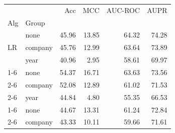 \begin{table}
\centering
\begin{tabular}{llrrrr}
\toprule
 &  & Acc & MCC & AUC-ROC & AUPR \\
Alg & Group &  &  &  &  \\
\midrule
\multirow[c]{3}{*}{LR} & none & {\cellcolor[HTML]{FDC28B}} \color[HTML]{000000} 45.96 & {\cellcolor[HTML]{D34601}} \color[HTML]{F1F1F1} 13.85 & {\cellcolor[HTML]{7F2704}} \color[HTML]{F1F1F1} 64.32 & {\cellcolor[HTML]{7F2704}} \color[HTML]{F1F1F1} 74.28 \\
\cline{2-6}
 & company & {\cellcolor[HTML]{FDC48F}} \color[HTML]{000000} 45.76 & {\cellcolor[HTML]{DE5005}} \color[HTML]{F1F1F1} 12.99 & {\cellcolor[HTML]{952F03}} \color[HTML]{F1F1F1} 63.64 & {\cellcolor[HTML]{8E2D04}} \color[HTML]{F1F1F1} 73.89 \\
\cline{2-6}
 & year & {\cellcolor[HTML]{FEE9D4}} \color[HTML]{000000} 40.96 & {\cellcolor[HTML]{FDD3A9}} \color[HTML]{000000} 2.95 & {\cellcolor[HTML]{FDAB66}} \color[HTML]{000000} 58.61 & {\cellcolor[HTML]{FD9C51}} \color[HTML]{000000} 69.97 \\
\cline{1-6} \cline{2-6}
\multirow[c]{3}{*}{HGB} & none & {\cellcolor[HTML]{EC620F}} \color[HTML]{F1F1F1} 54.37 & {\cellcolor[HTML]{9C3203}} \color[HTML]{F1F1F1} 16.71 & {\cellcolor[HTML]{952F03}} \color[HTML]{F1F1F1} 63.63 & {\cellcolor[HTML]{9B3203}} \color[HTML]{F1F1F1} 73.56 \\
\cline{2-6}
 & company & {\cellcolor[HTML]{F87D29}} \color[HTML]{F1F1F1} 52.08 & {\cellcolor[HTML]{DF5106}} \color[HTML]{F1F1F1} 12.89 & {\cellcolor[HTML]{ED6310}} \color[HTML]{F1F1F1} 61.02 & {\cellcolor[HTML]{ED6310}} \color[HTML]{F1F1F1} 71.53 \\
\cline{2-6}
 & year & {\cellcolor[HTML]{FDCE9E}} \color[HTML]{000000} 44.84 & {\cellcolor[HTML]{FDBD83}} \color[HTML]{000000} 4.80 & {\cellcolor[HTML]{FFF0E2}} \color[HTML]{000000} 55.35 & {\cellcolor[HTML]{FFF5EB}} \color[HTML]{000000} 66.53 \\
\cline{1-6} \cline{2-6}
\multirow[c]{3}{*}{SVM} & none & {\cellcolor[HTML]{FDD0A2}} \color[HTML]{000000} 44.67 & {\cellcolor[HTML]{DB4B03}} \color[HTML]{F1F1F1} 13.31 & {\cellcolor[HTML]{E85D0C}} \color[HTML]{F1F1F1} 61.24 & {\cellcolor[HTML]{BE3F02}} \color[HTML]{F1F1F1} 72.84 \\
\cline{2-6}
 & company & {\cellcolor[HTML]{FDD9B5}} \color[HTML]{000000} 43.33 & {\cellcolor[HTML]{F57622}} \color[HTML]{F1F1F1} 10.11 & {\cellcolor[HTML]{FD8C3B}} \color[HTML]{F1F1F1} 59.66 & {\cellcolor[HTML]{EB610F}} \color[HTML]{F1F1F1} 71.61 \\

\end{tabular}
\end{table}
